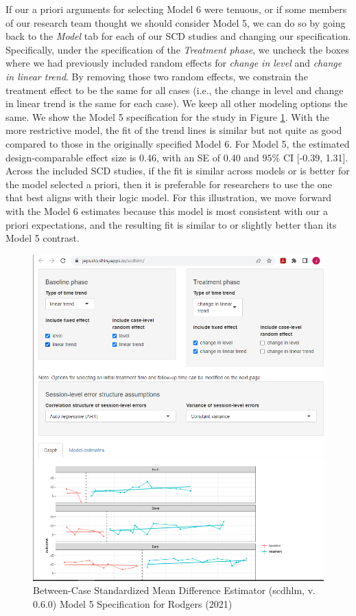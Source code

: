 \documentclass[
]{book}
\begin{document}
If our a priori arguments for selecting Model 6 were tenuous, or if some members of our research team thought we should consider Model 5, we can do so by going back to the \emph{Model} tab for each of our SCD studies and changing our specification. Specifically, under the specification of the \emph{Treatment phase}, we uncheck the boxes where we had previously included random effects for \emph{change in level} and \emph{change in linear trend}. By removing those two random effects, we constrain the treatment effect to be the same for all cases (i.e., the change in level and change in linear trend is the same for each case). We keep all other modeling options the same. We show the Model 5 specification for the \citet{rodgers2021Effects} study in Figure \ref{fig:Rodgers-2021-model5}. With the more restrictive model, the fit of the trend lines is similar but not quite as good compared to those in the originally specified Model 6. For Model 5, the estimated design-comparable effect size is 0.46, with an SE of 0.40 and \(95\%\) CI {[}-0.39, 1.31{]}. Across the included SCD studies, if the fit is similar across models or is better for the model selected a priori, then it is preferable for researchers to use the one that best aligns with their logic model. For this illustration, we move forward with the Model 6 estimates because this model is most consistent with our a priori expectations, and the resulting fit is similar to or slightly better than its Model 5 contrast.

\begin{figure}
\includegraphics[width=0.6\linewidth]{images/app.model.model5_Rodgers2020} \caption{Between-Case Standardized Mean Difference Estimator (scdhlm, v. 0.6.0) Model 5 Specification for Rodgers (2021)}\label{fig:Rodgers-2021-model5}
\end{figure}
\end{document}
